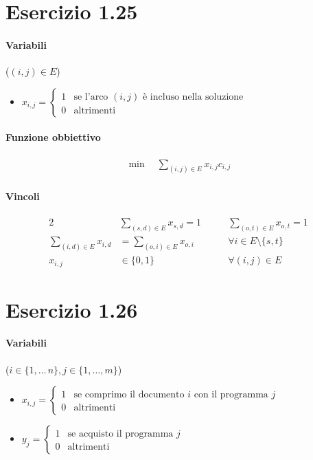 \documentclass{article}
\begin{document}
\pagebreak
\section{Esercizio 1.25}

\paragraph{Variabili} ($(i,j) \in E$)
\begin{itemize}
  \item $x_{i,j} = \begin{cases}
      1 & \text{se l'arco }(i,j)\text{ \`e incluso nella soluzione} \\
      0 & \text{altrimenti}
  \end{cases}$
\end{itemize}

\paragraph{Funzione obbiettivo}
\begin{align*}
  \min \quad \sum_{(i,j) \in E} x_{i,j} c_{i,j}
\end{align*}

\paragraph{Vincoli}
\begin{alignat}{2}
  &\sum_{(s,d) \in E} x_{s,d} = 1 \qquad&\sum_{(o, t) \in E} x_{o,t} = 1 \\
  \sum_{(i,d) \in E} x_{i,d} &= \sum_{(o,i) \in E} x_{o,i} \qquad&\forall i \in E \setminus \{s,t\}\\
  x_{i,j} &\in \{0,1\} &\forall (i,j) \in E
\end{alignat}

\pagebreak
\section{Esercizio 1.26}

\paragraph{Variabili} ($i \in \{1,\ldots\,n\}, j \in \{1,\ldots,m\}$)
\begin{itemize}
  \item $x_{i,j} = \begin{cases}
      1 & \text{se comprimo il documento }i\text{ con il programma }j \\
      0 & \text{altrimenti}
  \end{cases}$
  \item $y_j = \begin{cases}
      1 & \text{se acquisto il programma }j \\
      0 & \text{altrimenti}
  \end{cases}$
\end{itemize}
\end{document}
